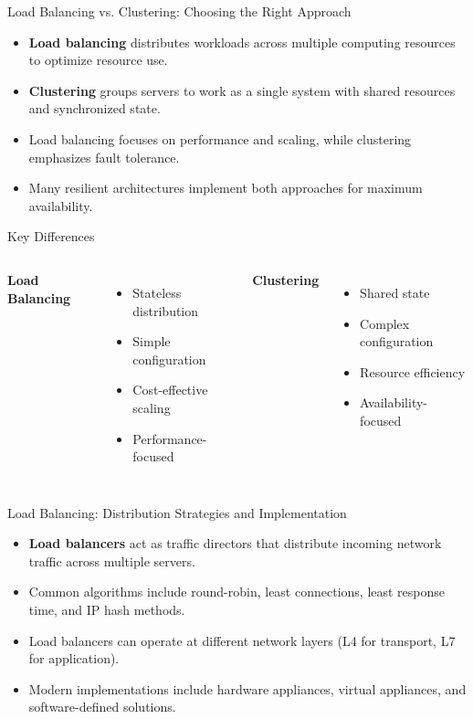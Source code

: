 \documentclass{beamer}
\begin{document}
\begin{frame}{Load Balancing vs. Clustering: Choosing the Right Approach}
    \begin{itemize}
        \item \textbf{Load balancing} distributes workloads across multiple computing resources to optimize resource use.
        \item \textbf{Clustering} groups servers to work as a single system with shared resources and synchronized state.
        \item Load balancing focuses on performance and scaling, while clustering emphasizes fault tolerance.
        \item Many resilient architectures implement both approaches for maximum availability.
    \end{itemize}
    
    \begin{block}{Key Differences}
        \begin{columns}
            \textbf{Load Balancing}
            \begin{itemize}
                \item Stateless distribution
                \item Simple configuration
                \item Cost-effective scaling
                \item Performance-focused
            \end{itemize}
            
            \textbf{Clustering}
            \begin{itemize}
                \item Shared state
                \item Complex configuration
                \item Resource efficiency
                \item Availability-focused
            \end{itemize}
        \end{columns}
    \end{block}
\end{frame}

\begin{frame}{Load Balancing: Distribution Strategies and Implementation}
    \begin{itemize}
        \item \textbf{Load balancers} act as traffic directors that distribute incoming network traffic across multiple servers.
        \item Common algorithms include round-robin, least connections, least response time, and IP hash methods.
        \item Load balancers can operate at different network layers (L4 for transport, L7 for application).
        \item Modern implementations include hardware appliances, virtual appliances, and software-defined solutions.
    \end{itemize}

\end{frame}
\end{document}
